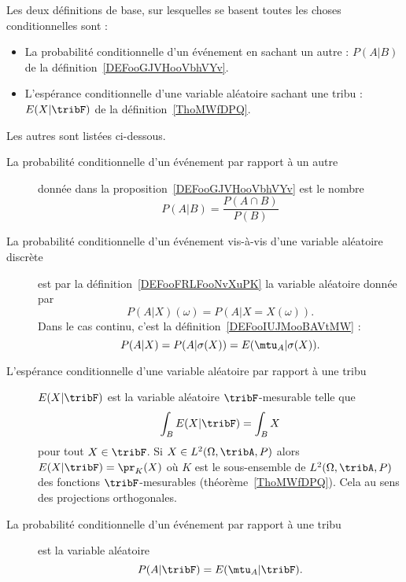 


    Les deux définitions de base, sur lesquelles se basent toutes les choses conditionnelles sont :
    \begin{itemize}
        \item La probabilité conditionnelle d'un événement en sachant un autre : \( P(A|B)\) de la définition~\ref{DEFooGJVHooVbhVYv}.
        \item L'espérance conditionnelle d'une variable aléatoire sachant une tribu : \( E(X|\tribF)\) de la définition~\ref{ThoMWfDPQ}.
    \end{itemize}

    Les autres sont listées ci-dessous.
\begin{description}

    \item[La probabilité conditionnelle d'un événement par rapport à un autre] donnée dans la proposition~\ref{DEFooGJVHooVbhVYv} est le nombre
\begin{equation}
    P(A|B)=\frac{ P(A\cap B) }{ P(B) }
\end{equation}

\item[La probabilité conditionnelle d'un événement vis-à-vis d'une variable aléatoire discrète] est par la définition~\ref{DEFooFRLFooNvXuPK} la variable aléatoire donnée par
\begin{equation}
    P(A|X)(\omega)=P(A|X=X(\omega)).
\end{equation}
Dans le cas continu, c'est la définition~\ref{DEFooIUJMooBAVtMW} :
\begin{equation}
    P(A|X)=P(A|\sigma(X))=E(\mtu_A|\sigma(X)).
\end{equation}

\item[L'espérance conditionnelle d'une variable aléatoire par rapport à une tribu] \( E(X|\tribF)\) est la variable aléatoire \( \tribF\)-mesurable telle que
\begin{equation}
    \int_BE(X|\tribF)=\int_BX
\end{equation}
pour tout \( X\in \tribF\). Si \( X\in L^2(\Omega,\tribA,P)\) alors \( E(X|\tribF)=\pr_K(X)\) où \( K\) est le sous-ensemble de \( L^2(\Omega,\tribA,P)\) des fonctions \( \tribF\)-mesurables (théorème~\ref{ThoMWfDPQ}). Cela au sens des projections orthogonales.

\item[La probabilité conditionnelle d'un événement par rapport à une tribu] est la variable aléatoire
\begin{equation}
    P(A|\tribF)=E(\mtu_A|\tribF).
\end{equation}


\end{description}

